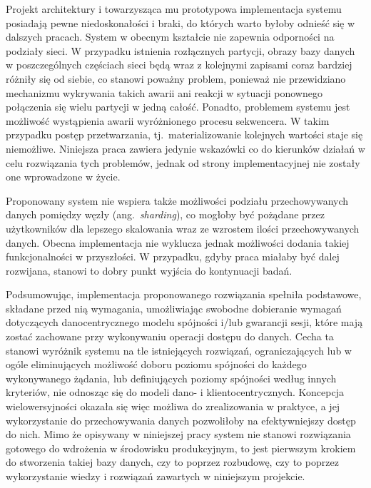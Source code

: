 Projekt architektury i towarzysząca mu prototypowa implementacja systemu posiadają pewne
niedoskonałości i braki, do których warto byłoby odnieść się w dalszych pracach. System w obecnym
kształcie nie zapewnia odporności na podziały sieci. W przypadku istnienia rozłącznych partycji,
obrazy bazy danych w poszczególnych częściach sieci będą wraz z kolejnymi zapisami coraz bardziej
różniły się od siebie, co stanowi poważny problem, ponieważ nie przewidziano mechanizmu wykrywania
takich awarii ani reakcji w sytuacji ponownego połączenia się wielu partycji w jedną całość.
Ponadto, problemem systemu jest możliwość wystąpienia awarii wyróżnionego procesu sekwencera. W
takim przypadku postęp przetwarzania, tj.\ materializowanie kolejnych wartości staje się niemożliwe. Niniejsza praca zawiera jedynie wskazówki co do kierunków działań w celu rozwiązania tych problemów, jednak od strony implementacyjnej nie zostały one wprowadzone w życie.

Proponowany system nie wspiera także możliwości podziału przechowywanych danych pomiędzy węzły
(ang.\ \textit{sharding}), co mogłoby być pożądane przez użytkowników dla lepszego skalowania wraz ze wzrostem ilości przechowywanych danych. Obecna implementacja nie wyklucza jednak możliwości dodania takiej funkcjonalności w przyszłości. W przypadku, gdyby praca miałaby być dalej rozwijana, stanowi to dobry punkt wyjścia do kontynuacji badań.

Podsumowując, implementacja proponowanego rozwiązania spełniła podstawowe, składane przed nią wymagania, umożliwiając swobodne dobieranie wymagań dotyczących danocentrycznego modelu spójności i/lub gwarancji sesji, które mają zostać zachowane przy wykonywaniu operacji dostępu do danych. Cecha ta stanowi wyróżnik systemu na tle istniejących rozwiązań, ograniczających lub w ogóle eliminujących możliwość doboru poziomu spójności do każdego wykonywanego żądania, lub definiujących poziomy spójności według innych kryteriów, nie odnosząc się do modeli dano- i klientocentrycznych. Koncepcja wielowersyjności okazała się więc możliwa do zrealizowania w praktyce, a jej wykorzystanie do przechowywania danych pozwoliłoby na efektywniejszy dostęp do nich. Mimo że opisywany w niniejszej pracy system nie stanowi rozwiązania gotowego do wdrożenia w środowisku produkcyjnym, to jest pierwszym krokiem do stworzenia takiej bazy danych, czy to poprzez rozbudowę, czy to poprzez wykorzystanie wiedzy i rozwiązań zawartych w niniejszym projekcie.
